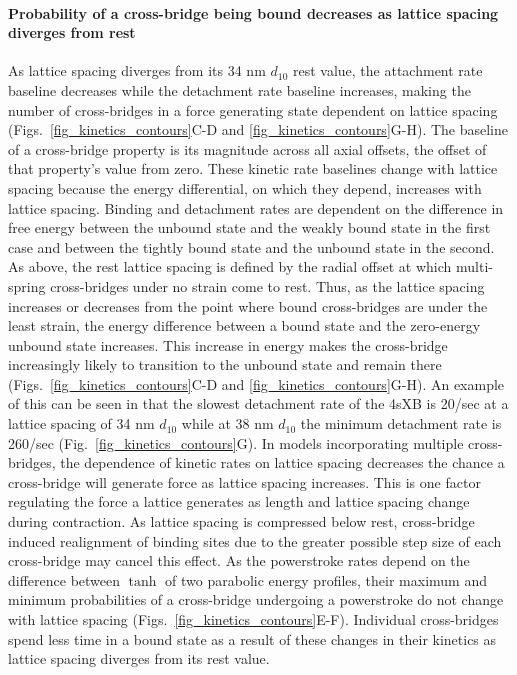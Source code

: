 \documentclass[]{article}
\begin{document}
\paragraph{Probability of a cross-bridge being bound decreases as lattice spacing diverges from rest} %
As lattice spacing diverges from its 34 nm $d_{10}$ rest value, the attachment rate baseline decreases while the detachment rate baseline increases, making the number of cross-bridges in a force generating state dependent on lattice spacing (Figs.~\ref{fig_kinetics_contours}C-D and \ref{fig_kinetics_contours}G-H). 
The baseline of a cross-bridge property is its magnitude across all axial offsets, the offset of that property's value from zero. 
These kinetic rate baselines change with lattice spacing because the energy differential, on which they depend, increases with lattice spacing.
Binding and detachment rates are dependent on the difference in free energy between the unbound state and the weakly bound state in the first case and between the tightly bound state and the unbound state in the second.
As above, the rest lattice spacing is defined by the radial offset at which multi-spring cross-bridges under no strain come to rest. 
Thus, as the lattice spacing increases or decreases from the point where bound cross-bridges are under the least strain, the energy difference between a bound state and the zero-energy unbound state increases. 
This increase in energy makes the cross-bridge increasingly likely to transition to the unbound state and remain there (Figs.~\ref{fig_kinetics_contours}C-D and  \ref{fig_kinetics_contours}G-H). 
An example of this can be seen in that the slowest detachment rate of the 4sXB is 20/sec at a lattice spacing of 34 nm $d_{10}$ while at 38 nm $d_{10}$ the minimum detachment rate is 260/sec (Fig.~\ref{fig_kinetics_contours}G).
In models incorporating multiple cross-bridges, the dependence of kinetic rates on lattice spacing decreases the chance a cross-bridge will generate force as lattice spacing increases. 
This is one factor regulating the force a lattice generates as length and lattice spacing change during contraction.
As lattice spacing is compressed below rest, cross-bridge induced realignment of binding sites due to the greater possible step size of each cross-bridge may cancel this effect.
As the powerstroke rates depend on the difference between $\tanh$ of two parabolic energy profiles, their maximum and minimum probabilities of a cross-bridge undergoing a powerstroke do not change with lattice spacing (Figs.~\ref{fig_kinetics_contours}E-F). 
Individual cross-bridges spend less time in a bound state as a result of these changes in their kinetics as lattice spacing diverges from its rest value.
\end{document}
